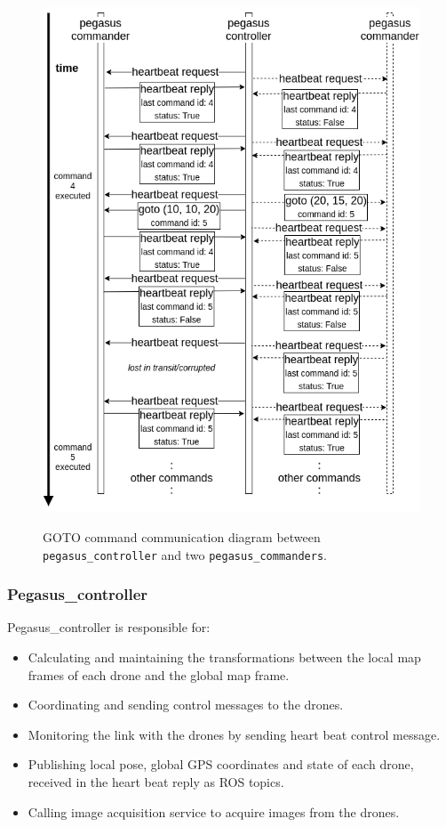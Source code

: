 \begin{figure}
	\centering
	\caption[Communication between \texttt{pegasus\_controller} and two \texttt{pegasus\_commander}.]{\small GOTO command communication diagram between \texttt{pegasus\_controller} and two \texttt{pegasus\_commanders}.}
	\includegraphics[width=5in]{figures/methodology/methodology-commander-controller-communication}
	\label{fig:communitation-controller-commander}
\end{figure}

\subsubsection{Pegasus\_controller}

Pegasus\_controller is responsible for:
\begin{itemize}
	\item Calculating and maintaining the transformations between the local map frames of each drone and the global map frame.
	\item Coordinating and sending control messages to the drones.
	\item Monitoring the link with the drones by sending heart beat control message.
	\item Publishing local pose, global GPS coordinates and state of each drone, received in the heart beat reply as ROS topics.
	\item Calling image acquisition service to acquire images from the drones.
\end{itemize}


